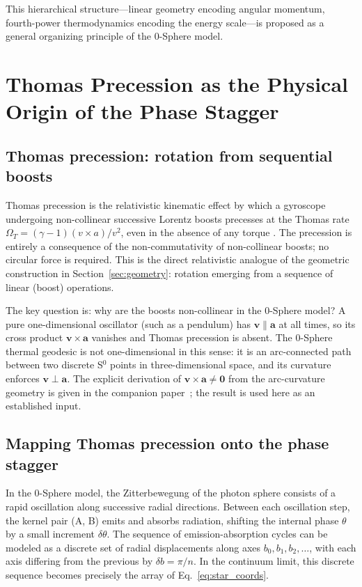\documentclass[%
 reprint, amsmath,amssymb, aps, prb, ]{revtex4-2}
\numberwithin{equation}{section}
\newcommand{\iphase}{\theta}
\begin{document}
This hierarchical structure---linear geometry encoding angular momentum, fourth-power thermodynamics encoding the energy scale---is proposed as a general organizing principle of the 0-Sphere model.

\section{Thomas Precession as the Physical Origin of the Phase Stagger}
\label{sec:thomas}

\subsection{Thomas precession: rotation from sequential boosts}

Thomas precession is the relativistic kinematic effect by which a gyroscope undergoing non-collinear successive Lorentz boosts precesses at the Thomas rate $\Omega_T = (\gamma - 1)(v \times a)/v^2$, even in the absence of any torque \cite{hanamura13, hanamura26}.
The precession is entirely a consequence of the non-commutativity of non-collinear boosts; no circular force is required.
This is the direct relativistic analogue of the geometric construction in Section~\ref{sec:geometry}: rotation emerging from a sequence of linear (boost) operations.

The key question is: why are the boosts non-collinear in the 0-Sphere model? A pure one-dimensional oscillator (such as a pendulum) has $\mathbf{v} \parallel \mathbf{a}$ at all times, so its cross product $\mathbf{v}\times\mathbf{a}$ vanishes and Thomas precession is absent. The 0-Sphere thermal geodesic is not one-dimensional in this sense: it is an arc-connected path between two discrete S$^0$ points in three-dimensional space, and its curvature enforces $\mathbf{v}\perp\mathbf{a}$. The explicit derivation of $\mathbf{v}\times\mathbf{a}\neq\mathbf{0}$ from the arc-curvature geometry is given in the companion paper~\cite{hanamura49}; the result is used here as an established input.

\subsection{Mapping Thomas precession onto the phase stagger}

In the 0-Sphere model, the Zitterbewegung of the photon sphere consists of a rapid oscillation along successive radial directions.
Between each oscillation step, the kernel pair (A, B) emits and absorbs radiation, shifting the internal phase $\iphase$ by a small increment $\delta\iphase$.
The sequence of emission-absorption cycles can be modeled as a discrete set of radial displacements along axes $b_0, b_1, b_2, \ldots$, with each axis differing from the previous by $\delta b = \pi/n$.
In the continuum limit, this discrete sequence becomes precisely the array of Eq.~\eqref{eq:star_coords}.
\end{document}
